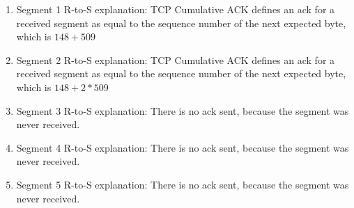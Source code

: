 \documentclass[letter,10pt]{article}
\begin{document}
\begin{enumerate}
	\item Segment 1 R-to-S explanation: TCP Cumulative ACK defines an ack for a received segment as equal to the sequence number of the next expected byte, which is $ 148 + 509 $
	\item Segment 2 R-to-S explanation: TCP Cumulative ACK defines an ack for a received segment as equal to the sequence number of the next expected byte, which is $ 148 + 2 * 509 $
	\item Segment 3 R-to-S explanation: There is no ack sent, because the segment was never received.
	\item Segment 4 R-to-S explanation: There is no ack sent, because the segment was never received.
	\item Segment 5 R-to-S explanation: There is no ack sent, because the segment was never received.
\end{enumerate}
\end{document}
